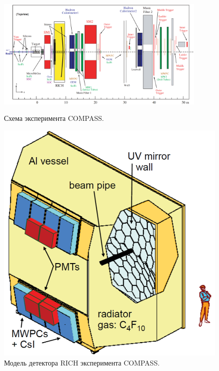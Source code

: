 
\begin{figure}[H]
\begin{minipage}[b]{0.695\textwidth}
\includegraphics[width=0.9\textwidth]{pictures/COMPASS.png}
\caption{Схема эксперимента COMPASS.}
\label{fig:Compass}
\end{minipage}
\hspace{0.01\textwidth}
\begin{minipage}[b]{0.295\textwidth}
\includegraphics[width=1.0\textwidth]{pictures/COMPASS_RICH.png}
\caption{Модель детектора RICH эксперимента COMPASS.}
\label{fig:CompassRich}
\end{minipage}
\end{figure}

